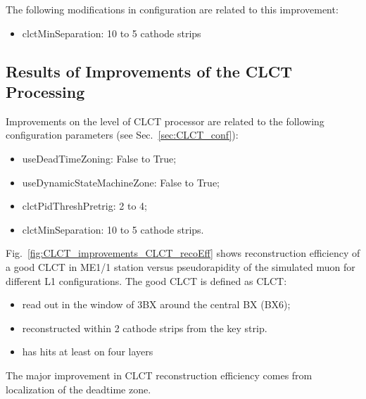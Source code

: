 The following modifications in configuration are related to this improvement:
\begin{itemize}
    \item clctMinSeparation: 10 to 5 cathode strips
\end{itemize}


\subsection{Results of Improvements of the CLCT Processing}

Improvements on the level of CLCT processor are related to the following configuration parameters (see Sec.~\ref{sec:CLCT_conf}):
\begin{itemize}
	\item useDeadTimeZoning: False to True;
	\item useDynamicStateMachineZone: False to True;
	\item clctPidThreshPretrig: 2 to 4;
	\item clctMinSeparation: 10 to 5 cathode strips.
\end{itemize}

Fig.~\ref{fig:CLCT_improvements_CLCT_recoEff} shows reconstruction efficiency of a good CLCT in ME1/1 station versus pseudorapidity of the simulated muon for different L1 configurations. The good CLCT is defined as CLCT:
\begin{itemize}
        \item read out in the window of 3BX around the central BX (BX6);
        \item reconstructed within 2 cathode strips from the key strip.
	\item has hits at least on four layers
\end{itemize}

The major improvement in CLCT reconstruction efficiency comes from localization of the deadtime zone.

